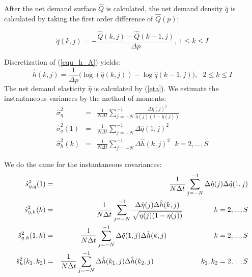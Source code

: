 \documentclass{article}
\begin{document}
After the net demand surface $\hat{Q}$ is calculated, the net demand density
$\hat{q}$ is calculated by taking the first order difference of $\hat{Q}(p)$:

\begin{equation*}
\hat{q}(k,j)=-\frac{\hat{Q}(k,j)-\hat{Q}(k-1,j)}{\Delta p}\text{, \ \ \ \ \ }%
1\leq k\leq I
\end{equation*}

Discretization of (\ref{equ_h_A}) yields:%
\begin{equation*}
\hat{h}(k,j)=\frac{1}{\Delta p}(\log (\hat{q}(k,j))-\log {\hat{q}(k-1,j)),}%
\text{ \ \ \ \ \ }2\leq k\leq I
\end{equation*}%
The net demand elasticity $\hat{\eta}$ is calculated by (\ref{eta}). We
estimate the instantaneous variances by the method of moments:
\begin{eqnarray*}
\hat{\sigma}_{\eta }^{2} &=&\frac{1}{N\Delta t}\sum_{j=-N}^{-1}\frac{\Delta
\hat{\eta}(j)^{2}}{\hat{\eta}(j)(1-\hat{\eta}(j))} \\
\hat{\sigma}_{q}^{2}(1) &=&\frac{1}{N\Delta t}\sum_{j=-N}^{-1}\Delta \hat{q}%
(1,j)^{2} \\
\hat{\sigma}_{h}^{2}(k) &=&\frac{1}{N\Delta t}\sum_{j=-N}^{-1}\Delta \hat{h}%
(k,j)^{2}\text{\ \ \ \ \ \ \ \ \ \ }k=2,...,S
\end{eqnarray*}

We do the same for the instantaneous covariances:%
\begin{eqnarray*}
\hat{s}_{\eta ,q}^{2}(1) &=&\frac{1}{N\Delta t}\sum_{j=-N}^{-1}\Delta \hat{%
\eta}(j)\Delta \hat{q}(1,j) \\
\hat{s}_{\eta ,h}^{2}(k) &=&\frac{1}{N\Delta t}\sum_{j=-N}^{-1}\frac{\Delta
\hat{\eta}(j)\Delta \hat{h}(k,j)}{\sqrt{\eta (j)(1-\eta (j))}}\text{ \ \ \ \
\ \ \ \ \ \ }k=2,...,S \\
\hat{s}_{q,h}^{2}(1,k) &=&\frac{1}{N\Delta t}\sum_{j=-N}^{-1}\Delta \hat{q}%
(1,j)\Delta \hat{h}(k,j)\text{ \ \ \ \ \ \ \ \ \ \ \ \ \ \ \ \ \ }k=2,...,S
\\
\hat{s}_{h}^{2}(k_{1},k_{2}) &=&\frac{1}{N\Delta t}\sum_{j=-N}^{-1}\Delta
\hat{h}(k_{1},j)\Delta \hat{h}(k_{2},j)\text{ \ \ \ \ \ \ \ \ \ \ \ \ \ \ \
\ \ }k_{1},k_{2}=2,...,S
\end{eqnarray*}
\end{document}
